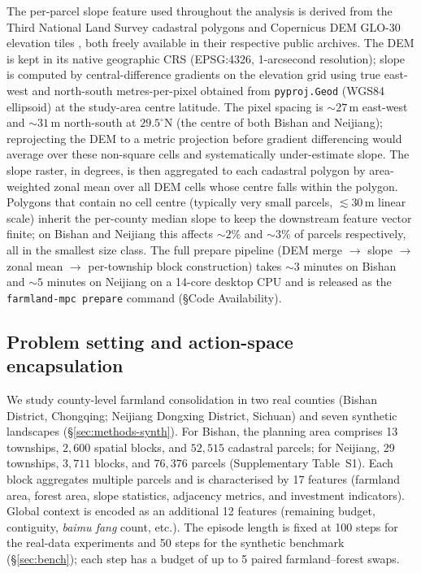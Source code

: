 \documentclass[11pt]{article}
\begin{document}
The per-parcel slope feature used throughout the analysis is derived from the Third National Land Survey cadastral polygons and Copernicus DEM GLO-30 elevation tiles \citep{copernicus2021dem}, both freely available in their respective public archives. The DEM is kept in its native geographic CRS (EPSG:4326, 1-arcsecond resolution); slope is computed by central-difference gradients on the elevation grid using true east-west and north-south metres-per-pixel obtained from \texttt{pyproj.Geod} (WGS84 ellipsoid) at the study-area centre latitude. The pixel spacing is $\sim$$27$\,m east-west and $\sim$$31$\,m north-south at $29.5^\circ$N (the centre of both Bishan and Neijiang); reprojecting the DEM to a metric projection before gradient differencing would average over these non-square cells and systematically under-estimate slope. The slope raster, in degrees, is then aggregated to each cadastral polygon by area-weighted zonal mean over all DEM cells whose centre falls within the polygon. Polygons that contain no cell centre (typically very small parcels, $\lesssim 30$\,m linear scale) inherit the per-county median slope to keep the downstream feature vector finite; on Bishan and Neijiang this affects $\sim$$2$\% and $\sim$$3$\% of parcels respectively, all in the smallest size class. The full prepare pipeline (DEM merge $\to$ slope $\to$ zonal mean $\to$ per-township block construction) takes $\sim$$3$ minutes on Bishan and $\sim$$5$ minutes on Neijiang on a 14-core desktop CPU and is released as the \texttt{farmland-mpc prepare} command (\S Code Availability).

\subsection*{Problem setting and action-space encapsulation}\label{sec:methods-action}

We study county-level farmland consolidation in two real counties (Bishan District, Chongqing; Neijiang Dongxing District, Sichuan) and seven synthetic landscapes (\S\ref{sec:methods-synth}). For Bishan, the planning area comprises 13 townships, $2{,}600$ spatial blocks, and $52{,}515$ cadastral parcels; for Neijiang, 29 townships, $3{,}711$ blocks, and $76{,}376$ parcels (Supplementary Table~S1). Each block aggregates multiple parcels and is characterised by 17 features (farmland area, forest area, slope statistics, adjacency metrics, and investment indicators). Global context is encoded as an additional 12 features (remaining budget, contiguity, \textit{baimu fang} count, etc.). The episode length is fixed at 100 steps for the real-data experiments and 50 steps for the synthetic benchmark (\S\ref{sec:bench}); each step has a budget of up to 5 paired farmland--forest swaps.
\end{document}
